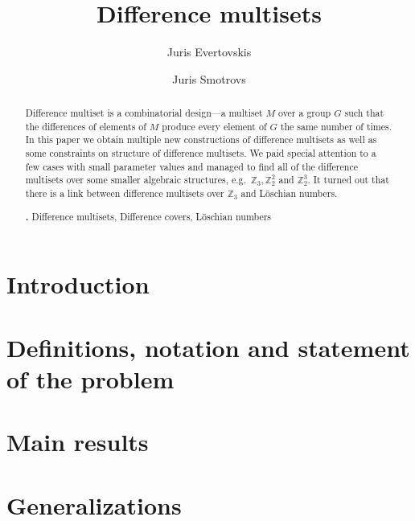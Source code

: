 \documentclass{amsart}
\theoremstyle{plain}
\theoremstyle{definition}
\theoremstyle{remark}
\begin{document}
	\title{Difference multisets}

	\author{Juris Evertovskis}

	\author{Juris Smotrovs}
	
	\address{Faculty of Computing, University of Latvia}

	\begin{abstract}
		Difference multiset is a combinatorial design---a multiset $M$ over a 
		group $G$ such that the differences of elements of $M$ produce every 
		element of $G$ the same number of times. In this paper we obtain 
		multiple new constructions of difference multisets as well as some 
		constraints on structure of difference multisets. We paid special 
		attention to a few cases with small parameter values and managed to 
		find all of the difference multisets over some smaller algebraic 
		structures, e.g.\ $\mathbb Z_3, \mathbb Z_2^2$ and $\mathbb Z_2^3$. 
		It turned out that there is a link between difference multisets over 
		$\mathbb Z_3$ and Löschian numbers.

		\smallskip
		\noindent \textbf{\keywordsname.} Difference multisets, Difference covers, Löschian numbers
	\end{abstract}

	\maketitle
    
    \section{Introduction}
    
     
	\section{Definitions, notation and statement of the problem}
    
	
    \section{Main results}
    
	
    \section{Generalizations}
    
\end{document}
